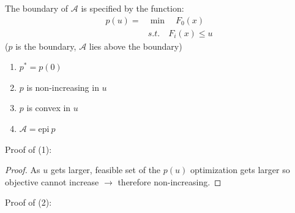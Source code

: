 The boundary of $\mathcal{A}$ is specified by the function:
\begin{align*}
	p(u) = &\min \quad F_0(x)\\
	&s.t. \quad F_i(x) \leq u
\end{align*}
($p$ is the boundary, $\mathcal{A}$ lies above the boundary)

\begin{enumerate}
	\item $p^* = p(0)$
	
	\item $p$ is non-increasing in $u$
	
	\item $p$ is convex in $u$
	
	\item $\mathcal{A} = \text{epi}\ p$
\end{enumerate}
Proof of (1): 
\begin{proof}
	As $u$ gets larger, feasible set of the $p(u)$ optimization gets larger so objective cannot increase $\rightarrow$ therefore non-increasing.
\end{proof}

Proof of (2):

